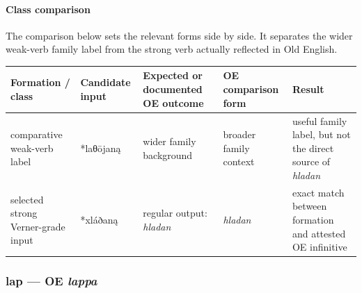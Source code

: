 \documentclass[
  british,
  a4paper,
]{article}
\newcounter{none} %
\begin{document}
\paragraph{Class comparison}\label{class-comparison-2}

The comparison below sets the relevant forms side by side. It separates
the wider weak-verb family label from the strong verb actually reflected
in Old English.

{\def\LTcaptype{none} %
\begin{longtable}[]{@{}
  >{\raggedright\arraybackslash}p{}
  >{\raggedright\arraybackslash}p{}
  >{\raggedright\arraybackslash}p{}
  >{\raggedright\arraybackslash}p{}
  >{\raggedright\arraybackslash}p{}@{}}
\toprule\noalign{}
\begin{minipage}[b]{\linewidth}\raggedright
Formation / class
\end{minipage} & \begin{minipage}[b]{\linewidth}\raggedright
Candidate input
\end{minipage} & \begin{minipage}[b]{\linewidth}\raggedright
Expected or documented OE outcome
\end{minipage} & \begin{minipage}[b]{\linewidth}\raggedright
OE comparison form
\end{minipage} & \begin{minipage}[b]{\linewidth}\raggedright
Result
\end{minipage} \\
\midrule\noalign{}
\endhead
\bottomrule\noalign{}
\endlastfoot
comparative weak-verb label & *laθōjaną & wider family background &
broader family context & useful family label, but not the direct source
of \emph{hladan} \\
selected strong Verner-grade input & *xláðaną & regular output:
\emph{hladan} & \emph{hladan} & exact match between formation and
attested OE infinitive \\
\end{longtable}
}

\subsubsection{\texorpdfstring{lap --- OE
\emph{lappa}}{lap --- OE lappa}}\label{lap-oe-lappa}
\end{document}
